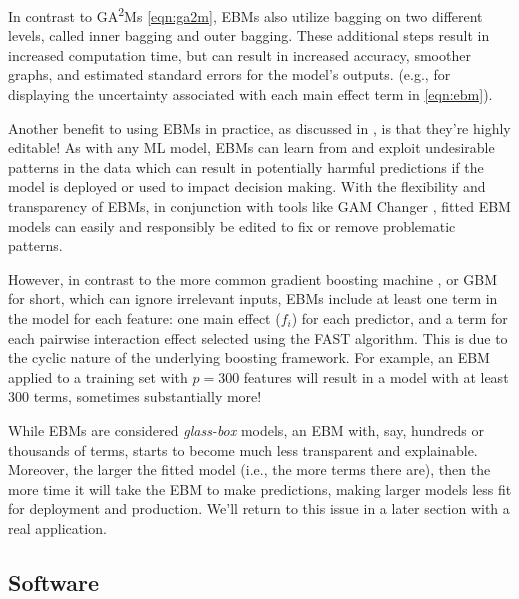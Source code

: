 In contrast to GA\textsuperscript{2}Ms \eqref{eqn:ga2m}, EBMs also
utilize bagging on two different levels, called inner bagging and outer
bagging. These additional steps result in increased computation time,
but can result in increased accuracy, smoother graphs, and estimated
standard errors for the model's outputs. (e.g., for displaying the
uncertainty associated with each main effect term in \eqref{eqn:ebm}).

Another benefit to using EBMs in practice, as discussed in
\citet{Py-gamchanger}, is that they're highly editable! As with any ML
model, EBMs can learn from and exploit undesirable patterns in the data
which can result in potentially harmful predictions if the model is
deployed or used to impact decision making. With the flexibility and
transparency of EBMs, in conjunction with tools like GAM Changer
\citep{Py-gamchanger}, fitted EBM models can easily and responsibly be
edited to fix or remove problematic patterns.

However, in contrast to the more common gradient boosting machine
\citep{friedman-2001-greedy, friedman-2002-stochastic}, or GBM for
short, which can ignore irrelevant inputs, EBMs include at least one
term in the model for each feature: one main effect (\(f_i\)) for each
predictor, and a term for each pairwise interaction effect selected
using the FAST algorithm. This is due to the cyclic nature of the
underlying boosting framework. For example, an EBM applied to a training
set with \(p = 300\) features will result in a model with at least 300
terms, sometimes substantially more!

While EBMs are considered \emph{glass-box} models, an EBM with, say,
hundreds or thousands of terms, starts to become much less transparent
and explainable. Moreover, the larger the fitted model (i.e., the more
terms there are), then the more time it will take the EBM to make
predictions, making larger models less fit for deployment and
production. We'll return to this issue in a later section with a real
application.

\subsection{Software}\label{software}

